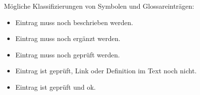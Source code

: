 Mögliche Klassifizierungen von Symbolen und Glossareinträgen:
\begin{itemize}
	\item \todoBeschreiben    Eintrag muss noch beschrieben werden.
	\item \todoErgaenzen      Eintrag muss noch ergänzt werden.
	\item \todoPruefen        Eintrag muss noch geprüft werden.
	\item \todoGeprueft       Eintrag ist geprüft, Link oder Definition im Text noch nicht.
	\item \todoOk             Eintrag ist geprüft und ok.
\end{itemize}
\else\fi

\Endchapter
